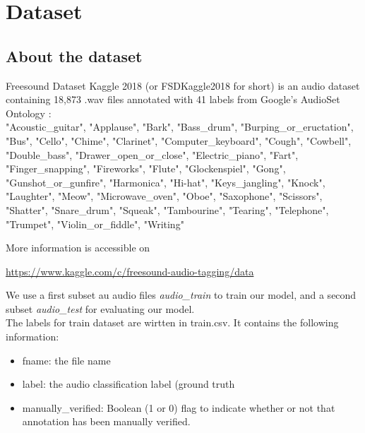 \documentclass{article} %
\begin{document}
\section{Dataset}
	\subsection{About the dataset}
		Freesound Dataset Kaggle 2018 (or FSDKaggle2018 for short) is an audio dataset containing 18,873 .wav files annotated with 41 labels from Google's AudioSet Ontology \cite{cite1}:\\

			"Acoustic\_guitar", "Applause", "Bark", "Bass\_drum", "Burping\_or\_eructation", "Bus", "Cello", "Chime", "Clarinet", "Computer\_keyboard", "Cough", "Cowbell", "Double\_bass", "Drawer\_open\_or\_close", "Electric\_piano", "Fart", "Finger\_snapping", "Fireworks", "Flute", "Glockenspiel", "Gong", "Gunshot\_or\_gunfire", "Harmonica", "Hi-hat", "Keys\_jangling", "Knock", "Laughter", "Meow", "Microwave\_oven", "Oboe", "Saxophone", "Scissors", "Shatter", "Snare\_drum", "Squeak", "Tambourine", "Tearing", "Telephone", "Trumpet", "Violin\_or\_fiddle", "Writing"\\
			\newline

		More information is accessible on 
		\begin{center} 
		\url{https://www.kaggle.com/c/freesound-audio-tagging/data}
		\end{center}

		We use a first subset au audio files \emph{audio\_train} to train our model, and a second subset \emph{audio\_test} for evaluating our model.\\
		The labels for train dataset are wirtten in train.csv. It contains the following information:
		\begin{itemize}
		    \item fname: the file name
		    \item label: the audio classification label (ground truth
		    \item manually\_verified: Boolean (1 or 0) flag to indicate whether or not that annotation has been manually verified.
		\end{itemize}
\end{document}
